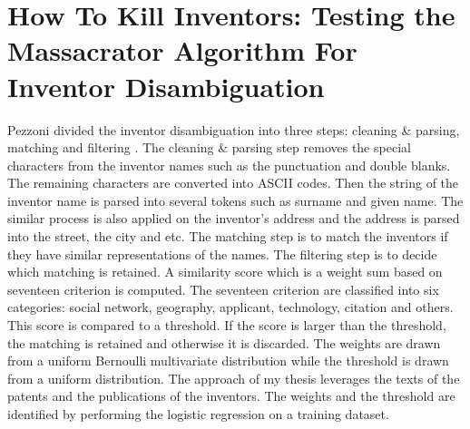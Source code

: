 \section{How To Kill Inventors: Testing the Massacrator Algorithm For Inventor Disambiguation}
Pezzoni divided the inventor disambiguation into three steps: cleaning \& parsing, matching and filtering \cite{RePEc:grt:wpegrt:2012-29}. The cleaning \& parsing step removes the special characters from the inventor names such as the punctuation and double blanks. The remaining characters are converted into ASCII codes. Then the string of the inventor name is parsed into several tokens such as surname and given name. The similar process is also applied on the inventor's address and the address is parsed into the street, the city and etc. The matching step is to match the inventors if they have similar representations of the names. The filtering step is to decide which matching is retained. A similarity score which is a weight sum based on seventeen criterion is computed. The seventeen criterion are classified into six categories: social network, geography, applicant, technology, citation and others.  This score is compared to a threshold. If the score is larger than the threshold, the matching is retained and otherwise it is discarded. The weights are drawn from a uniform Bernoulli multivariate distribution while the threshold is drawn from a uniform distribution. The approach of my thesis leverages the texts of the patents and the publications of the inventors. The weights and the threshold are identified by performing the logistic regression on a training dataset. 

